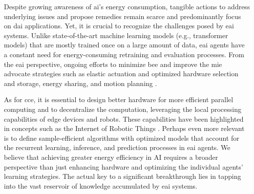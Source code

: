 \documentclass[12pt]{article}
\begin{document}
Despite growing awareness of \ac{ai}'s energy consumption, tangible actions to address underlying issues and propose remedies remain scarce and predominantly focus on \ac{dai} applications. Yet, it is crucial to recognize the challenges posed by \ac{eai} systems. Unlike state-of-the-art machine learning models (e.g., transformer models) that are mostly trained once on a large amount of data, \ac{eai} agents have a constant need for energy-consuming retraining and evaluation processes. From the \ac{eai} perspective, ongoing efforts to minimize \ac{bee} and improve the \ac{mie} advocate strategies such as elastic actuation and optimized hardware selection and storage, energy sharing, and motion planning \cite{CUT2015Smoothrobotmovements, Mohammed2014MinimizingEnergyConsumption, Chemnitz2011Analyzingenergyconsumption,Vasarhelyi2023OverviewEnergiesProblems,Sekala2024SelectedIssuesMethods}.

As for \ac{cce}, it is essential to design better hardware for more efficient parallel computing and to decentralize the computation, leveraging the local processing capabilities of edge devices and robots. These capabilities have been highlighted in concepts such as the Internet of Robotic Things \cite{Vermesan2020InternetRoboticThings,Sekala2024SelectedIssuesMethods}. Perhaps even more relevant is to define sample-efficient algorithms with optimized models that account for the recurrent learning, inference, and prediction processes in \ac{eai} agents. We believe that achieving greater energy efficiency in AI requires a broader perspective than just enhancing hardware and optimizing the individual agents' learning strategies. The actual key to a significant breakthrough lies in tapping into the vast reservoir of knowledge accumulated by \ac{eai} systems.
\end{document}
